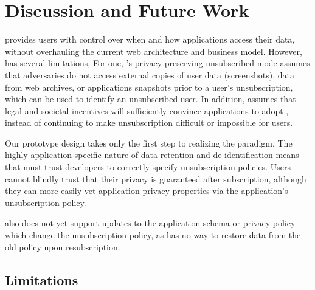 \section{Discussion and Future Work}
\name provides users with control over when and how applications access their data, without
overhauling the current web architecture and business model. However, \name has several limitations,
For one, \name's privacy-preserving unsubscribed mode assumes that adversaries do not access
external copies of user data (\eg screenshots), data from web archives, or applications snapshots
prior to a user's unsubscription, which can be used to identify an unsubscribed user. In addition,
\name assumes that legal and societal incentives will sufficiently convince applications to adopt
\name, instead of continuing to make unsubscription difficult or impossible for users.
       
Our prototype design takes only the first step to realizing the \name paradigm.
The highly application-specific nature of data retention and de-identification means that \sys 
must trust developers to correctly specify unsubscription policies. Users cannot blindly
trust that their privacy is guaranteed after subscription, although they can more easily vet
application privacy properties via the application's unsubscription policy. 

\sys also does not yet support updates to the application schema or privacy policy which 
change the unsubscription policy, as \sys has no way to restore data from the old policy upon
resubscription.



\iffalse
\subsection{Limitations}

